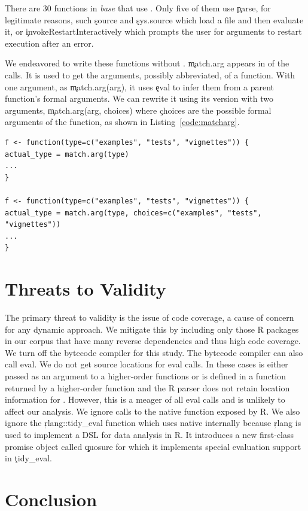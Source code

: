 \documentclass[conference]{IEEEtran}
\begin{document}
There are 30 functions in \emph{base} that use \eval. Only five of them use \c{parse}, for legitimate reasons, such \c{source} and \c{sys.source} which load a file and then evaluate it, or \c{invokeRestartInteractively} which prompts the user for arguments to restart execution after an error.

We endeavored  to write these functions without \eval. \c{match.arg} appears in \MatchArgPercent of the \eval calls. It is used to get the arguments, possibly abbreviated, of a function. With one argument, as \c{match.arg(arg)}, it uses \c{eval} to infer them from a parent function's formal arguments. We can rewrite it using its version with two arguments, \c{match.arg(arg, choices)} where \c{choices} are the possible formal arguments of the function, as shown in Listing~\ref{code:matcharg}.

\begin{lstlisting}[caption={Rewriting \c{match.arg} without \eval}, label=code:matcharg]
f <- function(type=c("examples", "tests", "vignettes")) {
actual_type = match.arg(type)
...
}

f <- function(type=c("examples", "tests", "vignettes")) {
actual_type = match.arg(type, choices=c("examples", "tests", "vignettes"))
...
}
\end{lstlisting}

\section{Threats to Validity} The primary threat to validity is the issue of
code coverage, a cause of concern for any dynamic approach. We mitigate this by
including only those R packages in our corpus that have many reverse
dependencies and thus high code coverage. We turn off the bytecode compiler for
this study. The bytecode compiler can also call eval. We do not get source
locations for \UndefinedEvalsRnd eval calls. In these cases \eval is either
passed as an argument to a higher-order functions or is defined in a function
returned by a higher-order function and the R parser does not retain location
information for \eval. However, this is a meager \PercentUndefinedEval of all
eval calls and is unlikely to affect our analysis. We ignore calls to the native
\eval function exposed by R. We also ignore the \c{rlang::tidy_eval} function
which uses native \eval internally because \c{rlang} is used to implement a DSL
for data analysis in R. It introduces a new first-class promise object called
\c{quosure} for which it implements special evaluation support in \c{tidy_eval}.

\section{Conclusion}



\end{document}
